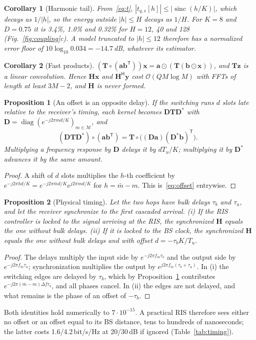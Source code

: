 \documentclass[conference,10pt]{IEEEtran}
\newtheorem{proposition}{Proposition}
\newtheorem{corollary}{Corollary}
\theoremstyle{remark}
\DeclareMathOperator{\diag}{diag}
\DeclareMathOperator{\sinc}{sinc}
\newcommand{\T}{\mathsf T}
\newcommand{\Hm}{\mathsf H}
\begin{document}
\begin{corollary}[Harmonic tail]\label{cor:tail}
From~\eqref{eq:t}, $|t_{q,s}[h]|\le|\sinc(h/K)|$, which decays as $1/|h|$, so the energy outside $|h|\le H$ decays as
$1/H$. For $K=8$ and $D=0.75$ it is 3.4\%, 1.0\% and 0.32\% for $H=12$, 40 and 128 (Fig.~\ref{fig:coupling}c). A model
truncated to $|h|\le12$ therefore has a normalized error floor of $10\log_{10}0.034=-14.7$\,dB, whatever its estimator.
\end{corollary}

\begin{corollary}[Fast products]\label{cor:fft}
$(\bm T\circ(\bm a\bm b^{\T}))\bm x=\bm a\odot(\bm T(\bm b\odot\bm x))$, and $\bm T\bm z$ is a linear convolution.
Hence $\bm H\bm x$ and $\bm H^{\Hm}\bm y$ cost $\mathcal O(QM\log M)$ with FFTs of length at least $3M-2$, and $\bm H$
is never formed.
\end{corollary}

\begin{proposition}[An offset is an opposite delay]\label{prop:offset}
If the switching runs $d$ slots late relative to the receiver's timing, each kernel becomes $\bm D\bm T\bm D^{*}$ with
$\bm D=\diag(e^{-j2\pi md/K})_{m\in\mathcal M}$, and
\begin{equation}
(\bm D\bm T\bm D^{*})\circ(\bm a\bm b^{\T})=\bm T\circ\big((\bm D\bm a)(\bm D^{*}\bm b)^{\T}\big).\label{eq:offset}
\end{equation}
Multiplying a frequency response by $\bm D$ delays it by $dT_u/K$; multiplying it by $\bm D^{*}$ advances it by the same amount.
\end{proposition}
\begin{proof}
A shift of $d$ slots multiplies the $h$-th coefficient by $e^{-j2\pi hd/K}=e^{-j2\pi\bar md/K}e^{j2\pi md/K}$ for
$h=\bar m-m$. This is~\eqref{eq:offset} entrywise.
\end{proof}

\begin{proposition}[Physical timing]\label{prop:phys}
Let the two hops have bulk delays $\tau_b$ and $\tau_u$, and let the receiver synchronize to the first cascaded arrival.
(i) If the RIS controller is locked to the signal arriving at the RIS, the synchronized $\bm H$ equals the one without
bulk delays. (ii) If it is locked to the BS clock, the synchronized $\bm H$ equals the one without bulk delays and with
offset $d=-\tau_b K/T_u$.
\end{proposition}
\begin{proof}
The delays multiply the input side by $e^{-j2\pi f_m\tau_b}$ and the output side by $e^{-j2\pi f_{\bar m}\tau_u}$;
synchronization multiplies the output by $e^{j2\pi f_{\bar m}(\tau_b+\tau_u)}$. In (i) the switching edges are delayed by
$\tau_b$, which by Proposition~\ref{prop:offset} contributes $e^{-j2\pi(\bar m-m)\Delta f\tau_b}$, and all phases cancel.
In (ii) the edges are not delayed, and what remains is the phase of an offset of $-\tau_b$.
\end{proof}
Both identities hold numerically to $7\cdot10^{-15}$. A practical RIS therefore sees either no offset or an offset
equal to its BS distance, tens to hundreds of nanoseconds; the latter costs 1.6/4.2\,bit/s/Hz at 20/30\,dB if
ignored (Table~\ref{tab:timing}).
\end{document}
